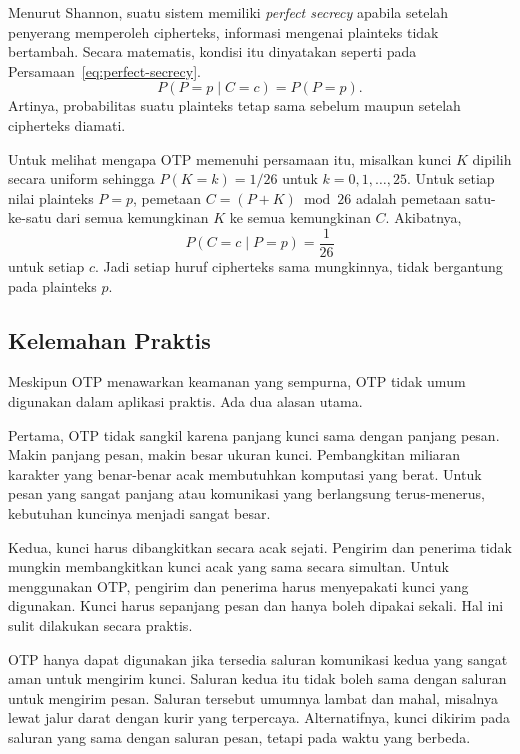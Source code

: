\documentclass[../../main.tex]{subfiles}
\begin{document}
Menurut Shannon, suatu sistem memiliki \textit{perfect secrecy} apabila
setelah penyerang memperoleh cipherteks, informasi mengenai plainteks tidak
bertambah. Secara matematis, kondisi itu dinyatakan seperti pada
Persamaan~\ref{eq:perfect-secrecy}.
\begin{equation}
    P(P=p \mid C=c) = P(P=p).
    \label{eq:perfect-secrecy}
\end{equation}
Artinya, probabilitas suatu plainteks tetap sama sebelum maupun setelah
cipherteks diamati.

Untuk melihat mengapa OTP memenuhi persamaan itu, misalkan kunci $K$ dipilih
secara uniform sehingga $P(K=k)=1/26$ untuk $k=0,1,\dots,25$. Untuk setiap
nilai plainteks $P=p$, pemetaan $C=(P+K) \bmod 26$ adalah pemetaan satu-ke-satu
dari semua kemungkinan $K$ ke semua kemungkinan $C$. Akibatnya,
\[
P(C=c \mid P=p) = \frac{1}{26}
\]
untuk setiap $c$. Jadi setiap huruf cipherteks sama mungkinnya, tidak
bergantung pada plainteks $p$.

\subsection{Kelemahan Praktis}
\label{sec:otp-kelemahan}

Meskipun OTP menawarkan keamanan yang sempurna, OTP tidak umum digunakan dalam
aplikasi praktis. Ada dua alasan utama.

Pertama, OTP tidak sangkil karena panjang kunci sama dengan panjang pesan.
Makin panjang pesan, makin besar ukuran kunci. Pembangkitan miliaran karakter
yang benar-benar acak membutuhkan komputasi yang berat. Untuk pesan yang
sangat panjang atau komunikasi yang berlangsung terus-menerus, kebutuhan
kuncinya menjadi sangat besar.

Kedua, kunci harus dibangkitkan secara acak sejati. Pengirim dan penerima
tidak mungkin membangkitkan kunci acak yang sama secara simultan. Untuk
menggunakan OTP, pengirim dan penerima harus menyepakati kunci yang digunakan.
Kunci harus sepanjang pesan dan hanya boleh dipakai sekali. Hal ini sulit
dilakukan secara praktis.

OTP hanya dapat digunakan jika tersedia saluran komunikasi kedua yang sangat
aman untuk mengirim kunci. Saluran kedua itu tidak boleh sama dengan saluran
untuk mengirim pesan. Saluran tersebut umumnya lambat dan mahal, misalnya
lewat jalur darat dengan kurir yang terpercaya. Alternatifnya, kunci dikirim
pada saluran yang sama dengan saluran pesan, tetapi pada waktu yang berbeda.
\end{document}

